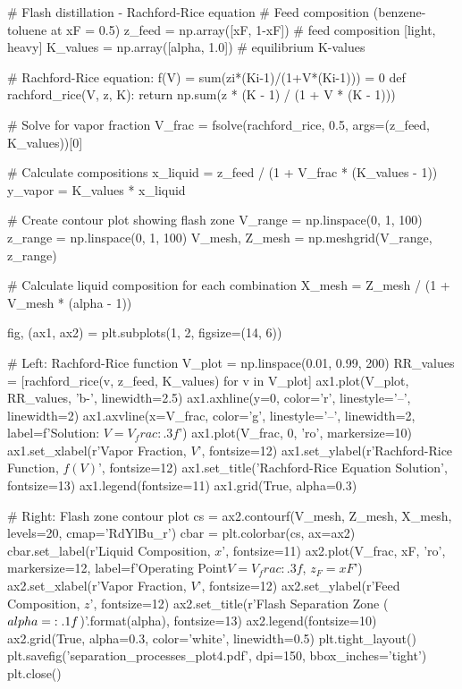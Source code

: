 \documentclass[11pt,a4paper]{article}
\begin{document}
\begin{pycode}
# Flash distillation - Rachford-Rice equation
# Feed composition (benzene-toluene at xF = 0.5)
z_feed = np.array([xF, 1-xF])  # feed composition [light, heavy]
K_values = np.array([alpha, 1.0])  # equilibrium K-values

# Rachford-Rice equation: f(V) = sum(zi*(Ki-1)/(1+V*(Ki-1))) = 0
def rachford_rice(V, z, K):
    return np.sum(z * (K - 1) / (1 + V * (K - 1)))

# Solve for vapor fraction
V_frac = fsolve(rachford_rice, 0.5, args=(z_feed, K_values))[0]

# Calculate compositions
x_liquid = z_feed / (1 + V_frac * (K_values - 1))
y_vapor = K_values * x_liquid

# Create contour plot showing flash zone
V_range = np.linspace(0, 1, 100)
z_range = np.linspace(0, 1, 100)
V_mesh, Z_mesh = np.meshgrid(V_range, z_range)

# Calculate liquid composition for each combination
X_mesh = Z_mesh / (1 + V_mesh * (alpha - 1))

fig, (ax1, ax2) = plt.subplots(1, 2, figsize=(14, 6))

# Left: Rachford-Rice function
V_plot = np.linspace(0.01, 0.99, 200)
RR_values = [rachford_rice(v, z_feed, K_values) for v in V_plot]
ax1.plot(V_plot, RR_values, 'b-', linewidth=2.5)
ax1.axhline(y=0, color='r', linestyle='--', linewidth=2)
ax1.axvline(x=V_frac, color='g', linestyle='--', linewidth=2,
            label=f'Solution: $V = {V_frac:.3f}$')
ax1.plot(V_frac, 0, 'ro', markersize=10)
ax1.set_xlabel(r'Vapor Fraction, $V$', fontsize=12)
ax1.set_ylabel(r'Rachford-Rice Function, $f(V)$', fontsize=12)
ax1.set_title('Rachford-Rice Equation Solution', fontsize=13)
ax1.legend(fontsize=11)
ax1.grid(True, alpha=0.3)

# Right: Flash zone contour plot
cs = ax2.contourf(V_mesh, Z_mesh, X_mesh, levels=20, cmap='RdYlBu_r')
cbar = plt.colorbar(cs, ax=ax2)
cbar.set_label(r'Liquid Composition, $x$', fontsize=11)
ax2.plot(V_frac, xF, 'ro', markersize=12, label=f'Operating Point\n$V={V_frac:.3f}$, $z_F={xF}$')
ax2.set_xlabel(r'Vapor Fraction, $V$', fontsize=12)
ax2.set_ylabel(r'Feed Composition, $z$', fontsize=12)
ax2.set_title(r'Flash Separation Zone ($\\alpha = {:.1f}$)'.format(alpha), fontsize=13)
ax2.legend(fontsize=10)
ax2.grid(True, alpha=0.3, color='white', linewidth=0.5)
plt.tight_layout()
plt.savefig('separation_processes_plot4.pdf', dpi=150, bbox_inches='tight')
plt.close()
\end{pycode}
\end{document}
